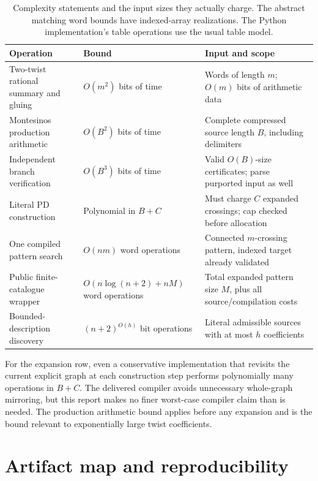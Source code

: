 \documentclass[11pt,a4paper]{article}
\theoremstyle{definition}
\theoremstyle{remark}
\numberwithin{equation}{section}
\begin{document}
\begin{table}[htbp]
\centering\small
\begin{tabularx}{\textwidth}{L{0.30\textwidth}L{0.25\textwidth}X}
\toprule
Operation & Bound & Input and scope\\
\midrule
Two-twist rational summary and gluing &
\(O(m^2)\) bits of time &
Words of length \(m\); \(O(m)\) bits of arithmetic data\\
\addlinespace
Montesinos production arithmetic &
\(O(B^2)\) bits of time &
Complete compressed source length \(B\), including delimiters\\
\addlinespace
Independent branch verification &
\(O(B^3)\) bits of time &
Valid \(O(B)\)-size certificates; parse purported input as well\\
\addlinespace
Literal PD construction &
Polynomial in \(B+C\) &
Must charge \(C\) expanded crossings; cap checked before allocation\\
\addlinespace
One compiled pattern search &
\(O(nm)\) word operations &
Connected \(m\)-crossing pattern, indexed target already validated\\
\addlinespace
Public finite-catalogue wrapper &
\(O(n\log(n+2)+nM)\) word operations &
Total expanded pattern size \(M\), plus all source/compilation costs\\
\addlinespace
Bounded-description discovery &
\((n+2)^{O(h)}\) bit operations &
Literal admissible sources with at most \(h\) coefficients\\
\bottomrule
\end{tabularx}
\caption{Complexity statements and the input sizes they actually charge.
The abstract matching word bounds have indexed-array realizations.
The Python implementation's table operations use the usual table model.}
\label{tab:complexity}
\end{table}

For the expansion row, even a conservative implementation that revisits
the current explicit graph at each construction step performs polynomially
many operations in \(B+C\). The delivered compiler avoids unnecessary
whole-graph mirroring, but this report makes no finer worst-case compiler
claim than is needed. The production arithmetic bound applies before
any expansion and is the bound relevant to exponentially large twist
coefficients.

\section{Artifact map and reproducibility}
\end{document}

